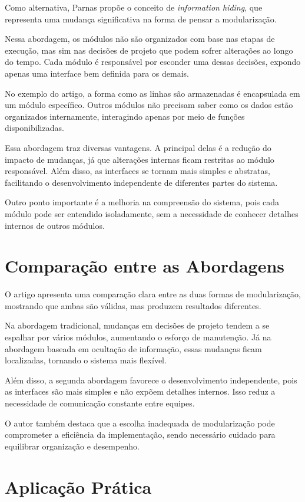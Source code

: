 \documentclass[conference]{IEEEtran}
\begin{document}
Como alternativa, Parnas propõe o conceito de \textit{information hiding}, que representa uma mudança significativa na forma de pensar a modularização.

Nessa abordagem, os módulos não são organizados com base nas etapas de execução, mas sim nas decisões de projeto que podem sofrer alterações ao longo do tempo. Cada módulo é responsável por esconder uma dessas decisões, expondo apenas uma interface bem definida para os demais.

No exemplo do artigo, a forma como as linhas são armazenadas é encapsulada em um módulo específico. Outros módulos não precisam saber como os dados estão organizados internamente, interagindo apenas por meio de funções disponibilizadas.

Essa abordagem traz diversas vantagens. A principal delas é a redução do impacto de mudanças, já que alterações internas ficam restritas ao módulo responsável. Além disso, as interfaces se tornam mais simples e abstratas, facilitando o desenvolvimento independente de diferentes partes do sistema.

Outro ponto importante é a melhoria na compreensão do sistema, pois cada módulo pode ser entendido isoladamente, sem a necessidade de conhecer detalhes internos de outros módulos.

\section{Comparação entre as Abordagens}

O artigo apresenta uma comparação clara entre as duas formas de modularização, mostrando que ambas são válidas, mas produzem resultados diferentes.

Na abordagem tradicional, mudanças em decisões de projeto tendem a se espalhar por vários módulos, aumentando o esforço de manutenção. Já na abordagem baseada em ocultação de informação, essas mudanças ficam localizadas, tornando o sistema mais flexível.

Além disso, a segunda abordagem favorece o desenvolvimento independente, pois as interfaces são mais simples e não expõem detalhes internos. Isso reduz a necessidade de comunicação constante entre equipes.

O autor também destaca que a escolha inadequada de modularização pode comprometer a eficiência da implementação, sendo necessário cuidado para equilibrar organização e desempenho.

\section{Aplicação Prática}
\end{document}
